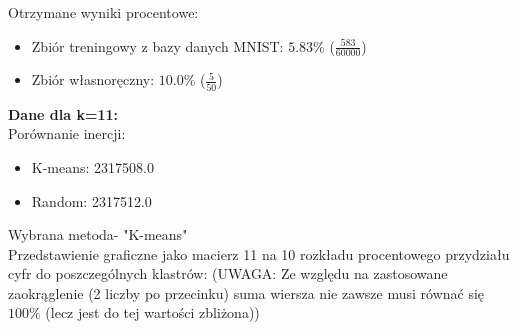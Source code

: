 \documentclass[a4paper,14pt]{report}
\begin{document}
	Otrzymane wyniki procentowe:
	\begin{itemize}
		\item Zbiór treningowy z bazy danych MNIST: $5.83\%$ ($\frac{583}{60000}$)
		\item Zbiór własnoręczny: $10.0\%$ ($\frac{5}{50}$)
	\end{itemize}
	\textbf{Dane dla k=11: } \\
	Porównanie inercji: 
	\begin{itemize}
		\item K-means: 2317508.0
		\item Random: 2317512.0
	\end{itemize}
	Wybrana metoda- "K-means" \\
	Przedstawienie graficzne jako macierz 11 na 10 rozkładu procentowego przydziału cyfr do poszczególnych klastrów:
	(UWAGA: Ze względu na zastosowane zaokrąglenie (2 liczby po przecinku) suma wiersza nie zawsze musi równać się $100\%$ (lecz jest do tej wartości zbliżona))
\end{document}
